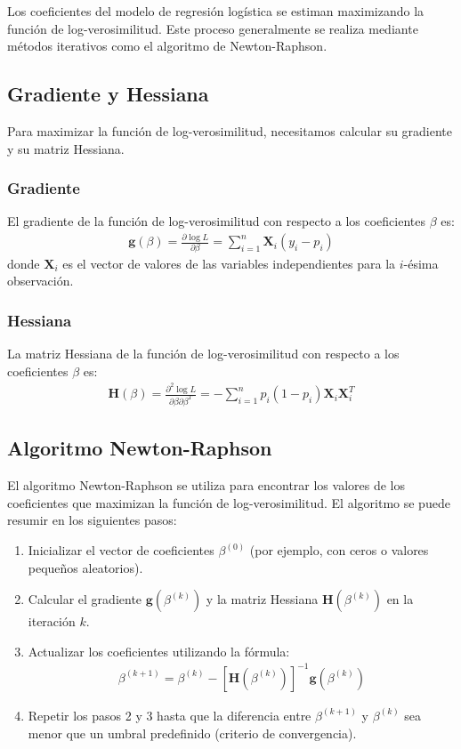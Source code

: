 Los coeficientes del modelo de regresi\'on log\'istica se estiman maximizando la funci\'on de log-verosimilitud. Este proceso generalmente se realiza mediante m\'etodos iterativos como el algoritmo de Newton-Raphson.

\subsection{Gradiente y Hessiana}

Para maximizar la funci\'on de log-verosimilitud, necesitamos calcular su gradiente y su matriz Hessiana.

\subsubsection{Gradiente}

El gradiente de la funci\'on de log-verosimilitud con respecto a los coeficientes $\beta$ es:
\begin{eqnarray*}
\mathbf{g}(\beta) = \frac{\partial \log L}{\partial \beta} = \sum_{i=1}^{n} \mathbf{X}_i (y_i - p_i)
\end{eqnarray*}
donde $\mathbf{X}_i$ es el vector de valores de las variables independientes para la $i$-\'esima observaci\'on.

\subsubsection{Hessiana}

La matriz Hessiana de la funci\'on de log-verosimilitud con respecto a los coeficientes $\beta$ es:
\begin{eqnarray*}
\mathbf{H}(\beta) = \frac{\partial^2 \log L}{\partial \beta \partial \beta^T} = -\sum_{i=1}^{n} p_i (1 - p_i) \mathbf{X}_i \mathbf{X}_i^T
\end{eqnarray*}

\subsection{Algoritmo Newton-Raphson}

El algoritmo Newton-Raphson se utiliza para encontrar los valores de los coeficientes que maximizan la funci\'on de log-verosimilitud. El algoritmo se puede resumir en los siguientes pasos:
\begin{enumerate}
    \item Inicializar el vector de coeficientes $\beta^{(0)}$ (por ejemplo, con ceros o valores peque\~nos aleatorios).
    \item Calcular el gradiente $\mathbf{g}(\beta^{(k)})$ y la matriz Hessiana $\mathbf{H}(\beta^{(k)})$ en la iteraci\'on $k$.
    \item Actualizar los coeficientes utilizando la f\'ormula:
    \begin{eqnarray*}
    \beta^{(k+1)} = \beta^{(k)} - \left[ \mathbf{H}(\beta^{(k)}) \right]^{-1} \mathbf{g}(\beta^{(k)})
    \end{eqnarray*}
    \item Repetir los pasos 2 y 3 hasta que la diferencia entre $\beta^{(k+1)}$ y $\beta^{(k)}$ sea menor que un umbral predefinido (criterio de convergencia).
\end{enumerate}

